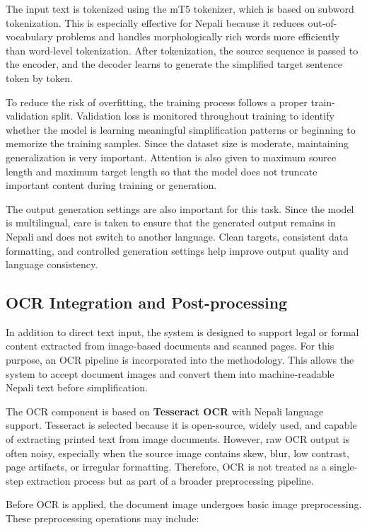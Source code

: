 \documentclass[12pt]{report}
\begin{document}
The input text is tokenized using the mT5 tokenizer, which is based on subword tokenization. This is especially effective for Nepali because it reduces out-of-vocabulary problems and handles morphologically rich words more efficiently than word-level tokenization. After tokenization, the source sequence is passed to the encoder, and the decoder learns to generate the simplified target sentence token by token.

To reduce the risk of overfitting, the training process follows a proper train-validation split. Validation loss is monitored throughout training to identify whether the model is learning meaningful simplification patterns or beginning to memorize the training samples. Since the dataset size is moderate, maintaining generalization is very important. Attention is also given to maximum source length and maximum target length so that the model does not truncate important content during training or generation.

The output generation settings are also important for this task. Since the model is multilingual, care is taken to ensure that the generated output remains in Nepali and does not switch to another language. Clean targets, consistent data formatting, and controlled generation settings help improve output quality and language consistency.

\subsection{OCR Integration and Post-processing}

In addition to direct text input, the system is designed to support legal or formal content extracted from image-based documents and scanned pages. For this purpose, an OCR pipeline is incorporated into the methodology. This allows the system to accept document images and convert them into machine-readable Nepali text before simplification.

The OCR component is based on \textbf{Tesseract OCR} with Nepali language support. Tesseract is selected because it is open-source, widely used, and capable of extracting printed text from image documents. However, raw OCR output is often noisy, especially when the source image contains skew, blur, low contrast, page artifacts, or irregular formatting. Therefore, OCR is not treated as a single-step extraction process but as part of a broader preprocessing pipeline.

Before OCR is applied, the document image undergoes basic image preprocessing. These preprocessing operations may include:
\end{document}
